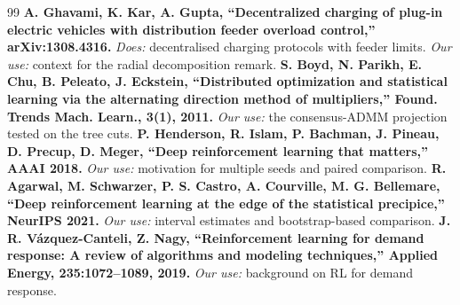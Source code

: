 \documentclass[11pt]{article}
\begin{document}
\begin{thebibliography}{99}
\textbf{A. Ghavami, K. Kar, A. Gupta, ``Decentralized charging of plug-in electric vehicles with distribution feeder overload control,'' arXiv:1308.4316.} \emph{Does:} decentralised charging protocols with feeder limits. \emph{Our use:} context for the radial decomposition remark.
\textbf{S. Boyd, N. Parikh, E. Chu, B. Peleato, J. Eckstein, ``Distributed optimization and statistical learning via the alternating direction method of multipliers,'' Found. Trends Mach. Learn., 3(1), 2011.} \emph{Our use:} the consensus-ADMM projection tested on the tree cuts.
\textbf{P. Henderson, R. Islam, P. Bachman, J. Pineau, D. Precup, D. Meger, ``Deep reinforcement learning that matters,'' AAAI 2018.} \emph{Our use:} motivation for multiple seeds and paired comparison.
\textbf{R. Agarwal, M. Schwarzer, P. S. Castro, A. Courville, M. G. Bellemare, ``Deep reinforcement learning at the edge of the statistical precipice,'' NeurIPS 2021.} \emph{Our use:} interval estimates and bootstrap-based comparison.
\textbf{J. R. V\'azquez-Canteli, Z. Nagy, ``Reinforcement learning for demand response: A review of algorithms and modeling techniques,'' Applied Energy, 235:1072--1089, 2019.} \emph{Our use:} background on RL for demand response.
\end{thebibliography}
\end{document}
